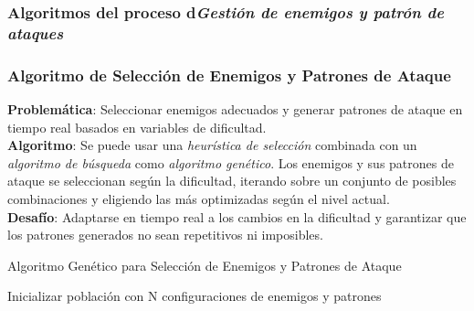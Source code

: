 \subsubsection{Algoritmos del proceso d\textit{Gestión de enemigos y patrón de ataques}}

\subsubsection*{Algoritmo de Selección de Enemigos y Patrones de Ataque}
\textbf{Problemática}: Seleccionar enemigos adecuados y generar patrones de ataque en tiempo real basados en variables de dificultad.\\
\textbf{Algoritmo}: Se puede usar una \textit{heurística de selección} combinada con un \textit{algoritmo de búsqueda} como \textit{algoritmo genético}. Los enemigos y sus patrones de ataque se seleccionan según la dificultad, iterando sobre un conjunto de posibles combinaciones y eligiendo las más optimizadas según el nivel actual.\\
\textbf{Desafío}: Adaptarse en tiempo real a los cambios en la dificultad y garantizar que los patrones generados no sean repetitivos ni imposibles.

\begin{algorithm}[H]
\caption{Algoritmo Genético para Selección de Enemigos y Patrones de Ataque}
\SetAlgoLined

Inicializar población con N configuraciones de enemigos y patrones\;

\;

\end{algorithm}

